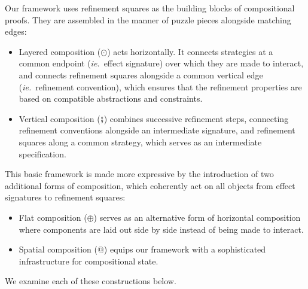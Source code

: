 Our framework uses
refinement squares as the building blocks of compositional proofs.
They are assembled in the manner of puzzle pieces
alongside matching edges:
\begin{itemize}
\item Layered composition ($\odot$) acts horizontally.
  It connects strategies at a common endpoint (\emph{ie.}~effect signature)
  over which they are made to interact,
  and connects refinement squares alongside a common
  vertical edge (\emph{ie.}~refinement convention),
  which ensures that the refinement properties
  are based on compatible abstractions and constraints.
\item Vertical composition ($\fatsemi$)
  combines successive refinement steps,
  connecting refinement conventions alongside an intermediate signature,
  and refinement squares along a common strategy,
  which serves as an intermediate specification.
\end{itemize}
This basic framework is made more expressive
by the introduction of two additional forms of composition,
which coherently act on all objects from effect signatures to refinement squares:
\begin{itemize}
\item Flat composition ($\oplus$)
  serves as an alternative form of horizontal composition
  where components are laid out side by side
  instead of being made to interact.
\item Spatial composition ($\mathbin@$)
  equips our framework with a sophisticated infrastructure
  for compositional state.
\end{itemize}
We examine each of these constructions below.



